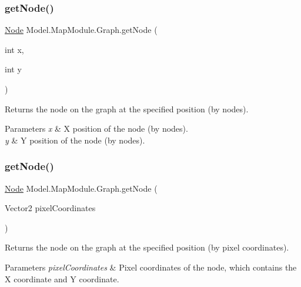 \subsubsection{\texorpdfstring{get\+Node()}{getNode()}\hspace{0.1cm}{\footnotesize\ttfamily [1/3]}}
{\footnotesize\ttfamily \hyperlink{class_model_1_1_map_module_1_1_node}{Node} Model.\+Map\+Module.\+Graph.\+get\+Node (\begin{DoxyParamCaption}\item[{int}]{x,  }\item[{int}]{y }\end{DoxyParamCaption})\hspace{0.3cm}{\ttfamily [inline]}}

Returns the node on the graph at the specified position (by nodes). 
\begin{DoxyParams}{Parameters}
{\em x} & X position of the node (by nodes). \\
\hline
{\em y} & Y position of the node (by nodes). \\
\hline
\end{DoxyParams}
\hypertarget{class_model_1_1_map_module_1_1_graph_ade10e8a4ae9111f8b0d7ba29c97537c5}{}\label{class_model_1_1_map_module_1_1_graph_ade10e8a4ae9111f8b0d7ba29c97537c5} 
\subsubsection{\texorpdfstring{get\+Node()}{getNode()}\hspace{0.1cm}{\footnotesize\ttfamily [2/3]}}
{\footnotesize\ttfamily \hyperlink{class_model_1_1_map_module_1_1_node}{Node} Model.\+Map\+Module.\+Graph.\+get\+Node (\begin{DoxyParamCaption}\item[{Vector2}]{pixel\+Coordinates }\end{DoxyParamCaption})\hspace{0.3cm}{\ttfamily [inline]}}

Returns the node on the graph at the specified position (by pixel coordinates). 
\begin{DoxyParams}{Parameters}
{\em pixel\+Coordinates} & Pixel coordinates of the node, which contains the X coordinate and Y coordinate. \\
\hline
\end{DoxyParams}
\hypertarget{class_model_1_1_map_module_1_1_graph_a4fa5605aa0de03db00c63308defe2a2d}{}\label{class_model_1_1_map_module_1_1_graph_a4fa5605aa0de03db00c63308defe2a2d} 
